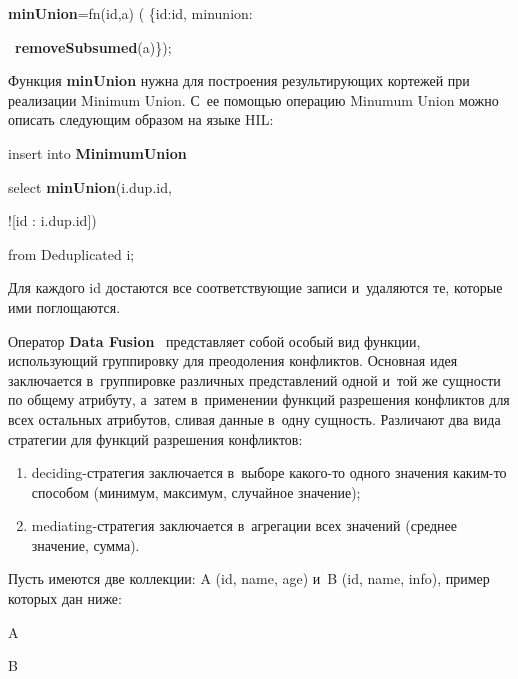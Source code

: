 \begin{multicols}{2}
{\sf
\noindent
{\textbf{minUnion}}\;=\;fn(id,a) ( \{id:id, minunion:


\noindent
\ {\textbf{removeSubsumed}}(a)\});
}

  Функция \textbf{minUnion} нужна для построения результирующих кортежей при
реализации Minimum Union. С~ее помощью операцию Minumum Union можно описать
следующим образом на языке HIL:

{\sf \noindent
  insert into {\textbf{MinimumUnion}}

\noindent
  select {\textbf{minUnion}}(i.dup.id,

\noindent
  ![id : i.dup.id])

\noindent
  from Deduplicated i;
  }

  Для каждого id достаются все соответствующие записи и~удаляются те, которые ими
поглощаются.

  Оператор \textbf{Data Fusion}~\cite{13-vov} представляет собой особый вид функции,
использующий группировку для преодоления конфликтов. Основная идея заключается
в~группировке различных представлений одной и~той же сущности по общему атрибуту,
а~затем в~применении функций разрешения конфликтов для всех остальных атрибутов,
сливая данные в~одну сущность. Различают два вида стратегии для функций разрешения
конфликтов:
  \begin{enumerate}[(1)]
\item deciding-стратегия заключается в~выборе ка\-ко\-го-то одного значения каким-то
способом (минимум, максимум, случайное значение);
\item mediating-стратегия заключается в~агрегации всех значений (среднее значение,
сумма).
\end{enumerate}

  Пусть имеются две коллекции: A (id, name, age) и~B (id, name, info), пример которых дан
ниже:

{\sf
\noindent
  A


  \vspace*{6pt}

\noindent
  B


}
\end{multicols}
